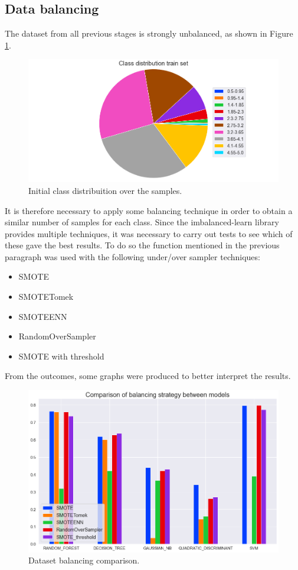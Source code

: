 \documentclass[../main]{subfiles}
\begin{document}
\subsection*{Data balancing}
The dataset from all previous stages is strongly unbalanced, as shown in Figure \ref{fig:unbalanced}.
\begin{figure}[h]
    \begin{center}
        \includegraphics[width=0.6\linewidth]{figures/class_distribution_initial.png}
    \end{center}
    
    \caption{Initial class distribuition over the samples.}
    \label{fig:unbalanced}
\end{figure}

It is therefore necessary to apply some balancing technique in order to obtain a similar number of samples for each class.
Since the imbalanced-learn \cite{JMLR:v18:16-365} library provides multiple techniques, it was necessary to carry out tests to see which of these gave the best results.
To do so the function mentioned in the previous paragraph was used with the following under/over sampler techniques:
\begin{itemize}
    \item SMOTE
    \item SMOTETomek
    \item SMOTEENN
    \item RandomOverSampler
    \item SMOTE with threshold
\end{itemize}

From the outcomes, some graphs were produced to better interpret the results.
\begin{figure}[h]
    \begin{center}
        \includegraphics[width=0.6\linewidth]{figures/imbalance_evaluation.png}
    \end{center}
    
    \caption{Dataset balancing comparison.}
    \label{fig:balance_evaluation}

\end{figure}
\end{document}
